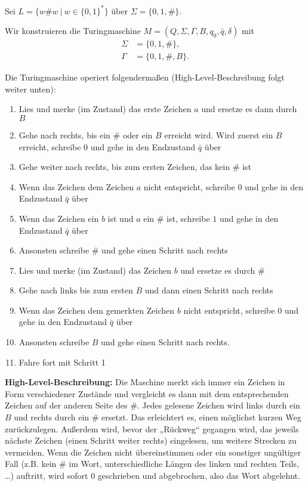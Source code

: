 Sei $L = \{w\#w\ |\ w \in \{0, 1\} ^{\ast}\}$ über $\Sigma = \{0, 1, \#\}$.


Wir konstruieren die Turingmaschine $M = (Q, \Sigma, \Gamma, B, q_0, \bar{q},
	\delta)$ mit
\begin{align*}
	\Sigma &= \{0, 1, \#\}, \\
	\Gamma &= \{0, 1, \#, B\}.
\end{align*}

Die Turingmaschine operiert folgendermaßen (High-Level-Beschreibung folgt weiter
unten):

\begin{enumerate}
	\item Lies und merke (im Zustand) das erste Zeichen $a$ und ersetze es dann
		durch $B$
	\item Gehe nach rechts, bis ein $\#$ oder ein $B$ erreicht wird. Wird zuerst
		ein	$B$ erreicht, schreibe $0$ und gehe in den Endzustand $\bar{q}$ über
	\item Gehe weiter nach rechts, bis zum ersten Zeichen, das kein $\#$ ist
	\item Wenn das Zeichen dem Zeichen $a$ nicht entspricht, schreibe $0$ und
		gehe in den Endzustand $\bar{q}$ über
	\item Wenn das Zeichen ein $b$ ist und $a$ ein $\#$ ist, schreibe $1$ und
		gehe in den Endzustand $\bar{q}$ über
	\item Ansonsten schreibe $\#$ und gehe einen Schritt nach rechts
	\item Lies und merke (im Zustand) das Zeichen $b$ und ersetze es durch $\#$
	\item Gehe nach links bis zum ersten $B$ und dann einen Schritt nach rechts
	\item Wenn das Zeichen dem gemerkten Zeichen $b$ nicht entspricht, schreibe
		$0$ und gehe in den Endzustand $\bar{q}$ über
	\item Ansonsten schreibe $B$ und gehe einen Schritt nach rechts.
	\item Fahre fort mit Schritt 1
\end{enumerate}

\textbf{High-Level-Beschreibung:} Die Maschine merkt sich immer ein Zeichen in
Form verschiedener Zustände und vergleicht es dann mit dem entsprechenden
Zeichen auf der anderen Seite des $\#$. Jedes gelesene Zeichen wird links durch
ein $B$ und rechts durch ein $\#$ ersetzt. Das erleichtert es, einen möglichst
kurzen Weg zurückzulegen. Außerdem wird, bevor der „Rückweg“ gegangen wird, das
jeweils nächste Zeichen (einen Schritt weiter rechts) eingelesen, um weitere
Strecken zu vermeiden. Wenn die Zeichen nicht übereinstimmen oder ein sonstiger
ungültiger Fall (z.B. kein $\#$ im Wort, unterschiedliche Längen des linken und
rechten Teils, \dots) auftritt, wird sofort $0$ geschrieben und abgebrochen,
also das Wort abgelehnt.

